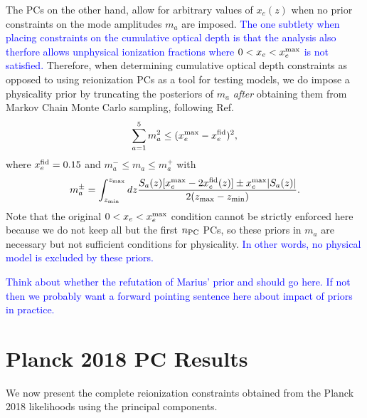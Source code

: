 \documentclass[prd,twocolumn,amsmath,amssymb,floatfix,superscriptaddress,nofootinbib]{revtex4-1}
\newcommand{\wh}[1]{\textcolor{blue}{#1}}
\begin{document}
The PCs on the other hand, allow for arbitrary values of $x_e(z)$ when no prior constraints on the mode amplitudes $m_a$ are imposed.  \wh{The one subtlety when placing constraints on the cumulative optical depth is that the analysis also therfore allows
unphysical ionization fractions where $0<x_e<x_e^{\rm max}$  is not satisfied.}
Therefore, when determining cumulative optical depth constraints as opposed to using reionization PCs as a tool for testing models,
 we do impose a physicality prior
 by truncating the posteriors of $m_a$
 {\it after} obtaining them from Markov Chain Monte Carlo sampling, following Ref.~\cite{Mortonson:2008rx}
%
\begin{equation}
\sum_{a=1}^5 m_a^2 \le (x_e^{\rm max}-x_e^{\rm fid})^2,
\end{equation}
where $x_e^{\rm fid}=0.15$ and $m_a^{-} \le m_a \le m_a^{+}$ with
\begin{equation}
m_a^{\pm} = \int_{z_{\rm min}}^{z_{\rm max} } dz \frac{S_a(z)[x_e^{\rm max} -2 x_e^{\rm fid}(z)]
\pm x_e^{\rm max} | S_a(z)|}{2(z_{\rm max}-z_{\rm min})}.
\label{eq:individualprior}
\end{equation}
%
Note that the original $0<x_e<x_e^{\rm max}$ condition cannot be strictly enforced here because we do not keep all but the first $n_{\rm PC}$ PCs, so these priors in $m_a$ are necessary but not sufficient conditions for physicality.  \wh{In other words, no physical model is excluded by these priors.}  
%



\wh{Think about whether the refutation of Marius' prior and should go here.  If not then we probably want a forward pointing sentence here about impact of priors in practice.}


\section{Planck 2018 PC Results}
\label{sec:results}
We now present the complete reionization constraints obtained from the Planck 2018 likelihoods using the principal components.
\end{document}
